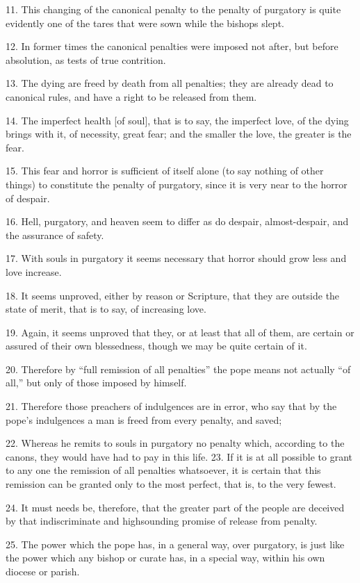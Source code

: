 11. This changing of the canonical penalty to the penalty of purgatory
is quite evidently one of the tares that were sown while the bishops
slept.

12. In former times the canonical penalties were imposed not after, but
before absolution, as tests of true contrition.

13. The dying are freed by death from all penalties; they are already
dead to canonical rules, and have a right to be released from them.

14. The imperfect health [of soul], that is to say, the imperfect love,
of the dying brings with it, of necessity, great fear; and the smaller
the love, the greater is the fear.

15. This fear and horror is sufficient of itself alone (to say nothing
of other things) to constitute the penalty of purgatory, since it is
very near to the horror of despair.

16. Hell, purgatory, and heaven seem to differ as do despair,
almost-despair, and the assurance of safety.

17. With souls in purgatory it seems necessary that horror should grow
less and love increase.

18. It seems unproved, either by reason or Scripture, that they are
outside the state of merit, that is to say, of increasing love.

19. Again, it seems unproved that they, or at least that all of them,
are certain or assured of their own blessedness, though we may be quite
certain of it.

20. Therefore by ``full remission of all penalties'' the pope means not
actually ``of all,'' but only of those imposed by himself.

21. Therefore those preachers of indulgences are in error, who say that
by the pope's indulgences a man is freed from every penalty, and saved;

22. Whereas he remits to souls in purgatory no penalty which, according
to the canons, they would have had to pay in this life. 23. If it is
at all possible to grant to any one the remission of all penalties
whatsoever, it is certain that this remission can be granted only to
the most perfect, that is, to the very fewest.

24. It must needs be, therefore, that the greater part of the people
are deceived by that indiscriminate and highsounding promise of release
from penalty.

25. The power which the pope has, in a general way, over purgatory, is
just like the power which any bishop or curate has, in a special way,
within his own diocese or parish.

